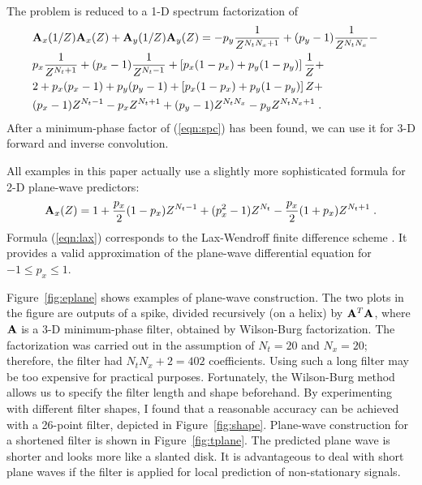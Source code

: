 The problem is reduced to a 1-D spectrum factorization of
\begin{eqnarray}
\nonumber 
& \bold{A}_x (1/Z) \bold{A}_x (Z) + \bold{A}_y (1/Z) \bold{A}_y (Z) = 
- p_y \frac{1}{Z^{N_t N_x + 1}} + (p_y - 1) \frac{1}{Z^{N_t N_x}} -
& \\
\nonumber 
& p_x \frac{1}{Z^{N_t + 1}} + (p_x - 1) \frac{1}{Z^{N_t-1}}  + 
\left[p_x (1 - p_x) + p_y (1 - p_y)\right] \frac{1}{Z} +
& \\
\nonumber
& 2 + 
p_x (p_x - 1) + p_y (p_y - 1) + 
\left[p_x (1 - p_x) + p_y (1 - p_y)\right] Z + & \\
&  (p_x - 1) Z^{N_t-1}
- p_x Z^{N_t + 1} + (p_y - 1) Z^{N_t N_x}
- p_y Z^{N_t N_x + 1}\;. &
\label{eqn:spc}
\end{eqnarray}
After a minimum-phase factor of (\ref{eqn:spc}) has been found, we can
use it for 3-D forward and inverse convolution.
\par
All examples in this paper actually use a slightly more sophisticated
formula for 2-D plane-wave predictors:
\begin{equation}
\label{eqn:lax}
\bold{A}_x (Z) = 1  + \frac{p_x}{2} (1 - p_x) Z^{N_t - 1} + (p_x^2 - 1) Z^{N_t}
- \frac{p_x}{2} (1 + p_x) Z^{N_t + 1}\;.
\end{equation}
Formula (\ref{eqn:lax}) corresponds to the Lax-Wendroff finite
difference scheme \cite{Clapp.sep.95.bob1}.  It provides a valid
approximation of the plane-wave differential equation for 
$-1 \le p_x \le 1$.
\par
{}


 
Figure~\ref{fig:eplane} shows examples of plane-wave construction. The
two plots in the figure are outputs of a spike, divided recursively
(on a helix) by $\bold{A}^{T} \bold{A}$, where $\bold{A}$ is a 3-D
minimum-phase filter, obtained by Wilson-Burg factorization. The
factorization was carried out in the assumption of $N_t=20$ and
$N_x=20$; therefore, the filter had $N_t N_x +2 = 402$ coefficients.
Using such a long filter may be too expensive for practical purposes.
Fortunately, the Wilson-Burg method allows us to specify the filter
length and shape beforehand. By experimenting with different filter
shapes, I found that a reasonable accuracy can be achieved with a
26-point filter, depicted in Figure~\ref{fig:shape}. Plane-wave
construction for a shortened filter is shown in
Figure~\ref{fig:tplane}. The predicted plane wave is shorter and looks
more like a slanted disk. It is advantageous to deal with short plane
waves if the filter is applied for local prediction of non-stationary
signals.

